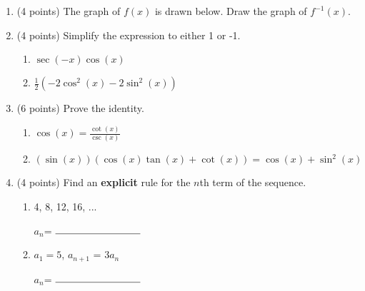 \documentclass[11pt]{article}
\begin{document}
\begin{enumerate}
\item (4 points) The graph of $f(x)$ is drawn below. Draw the graph of $f^{-1}(x)$.
\vspace{10pt}
\begin{center}
\end{center}


\item (4 points) Simplify the expression to either 1 or -1.

\begin{enumerate}[itemsep=60pt, label={\alph*)}]
    \item $\displaystyle \sec(-x) \cos(x) $
    \item $\displaystyle \frac{1}{2}(-2\cos^2(x) - 2\sin^2(x)) $
\end{enumerate}
\vspace{60pt}

\newpage

\item (6 points) Prove the identity.
\begin{enumerate}[itemsep=150pt, label={\alph*)}]
    \item $\displaystyle \cos(x) = \frac{\cot(x)}{\csc(x)}$
    \item $\displaystyle (\sin(x))(\cos(x)\tan(x) + \cot(x)) = \cos(x) + \sin^2(x)$
\end{enumerate}

\vspace{250pt}

\item (4 points) Find an \textbf{explicit} rule for the $n$th term of the sequence.
\begin{enumerate}[itemsep=30pt, label={\alph*)}]
\item 4, 8, 12, 16, ...
\begin{flushright}
$a_n$= $\rule{3cm}{0.4pt}$
\end{flushright}
\item $a_1 = 5$, $a_{n+1}$ = $3a_{n}$
\begin{flushright}
$a_n$= $\rule{3cm}{0.4pt}$
\end{flushright}
\end{enumerate}


\end{enumerate}
\end{document}
